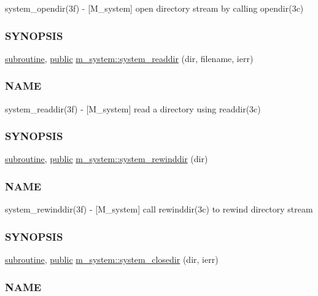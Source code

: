 \begin{DoxyCompactItemize}
\begin{DoxyCompactList}
system\+\_\+opendir(3f) -\/ \mbox{[}M\+\_\+system\mbox{]} open directory stream by calling opendir(3c) \subsubsection*{S\+Y\+N\+O\+P\+S\+IS}\end{DoxyCompactList}\item 
\hyperlink{M__stopwatch_83_8txt_acfbcff50169d691ff02d4a123ed70482}{subroutine}, \hyperlink{M__stopwatch_83_8txt_a2f74811300c361e53b430611a7d1769f}{public} \hyperlink{namespacem__system_a983df5b2d7cb5842d69c4a31829403e0}{m\+\_\+system\+::system\+\_\+readdir} (dir, filename, ierr)
\begin{DoxyCompactList}\small\item\em \subsubsection*{N\+A\+ME}

system\+\_\+readdir(3f) -\/ \mbox{[}M\+\_\+system\mbox{]} read a directory using readdir(3c) \subsubsection*{S\+Y\+N\+O\+P\+S\+IS}\end{DoxyCompactList}\item 
\hyperlink{M__stopwatch_83_8txt_acfbcff50169d691ff02d4a123ed70482}{subroutine}, \hyperlink{M__stopwatch_83_8txt_a2f74811300c361e53b430611a7d1769f}{public} \hyperlink{namespacem__system_a3ffe757195ade8052e8acabd196ee3ca}{m\+\_\+system\+::system\+\_\+rewinddir} (dir)
\begin{DoxyCompactList}\small\item\em \subsubsection*{N\+A\+ME}

system\+\_\+rewinddir(3f) -\/ \mbox{[}M\+\_\+system\mbox{]} call rewinddir(3c) to rewind directory stream \subsubsection*{S\+Y\+N\+O\+P\+S\+IS}\end{DoxyCompactList}\item 
\hyperlink{M__stopwatch_83_8txt_acfbcff50169d691ff02d4a123ed70482}{subroutine}, \hyperlink{M__stopwatch_83_8txt_a2f74811300c361e53b430611a7d1769f}{public} \hyperlink{namespacem__system_acd442b52c64fc50482bc08b0ac8a50d1}{m\+\_\+system\+::system\+\_\+closedir} (dir, ierr)
\begin{DoxyCompactList}\small\item\em \subsubsection*{N\+A\+ME}


\end{DoxyCompactList}
\end{DoxyCompactItemize}
